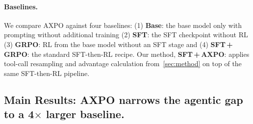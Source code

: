 \documentclass{llmxive}
\providecommand{\toolresample}{tool-call resampling\xspace}
\begin{document}
\paragraph{Baselines.}
We compare AXPO against four baselines: (1) \textbf{Base}: the base model only with prompting without additional training (2) \textbf{SFT}: the SFT checkpoint without RL (3) \textbf{GRPO}: RL from the base model without an SFT stage and (4) \textbf{SFT\,+\,GRPO}: the standard SFT-then-RL recipe.
Our method, \textbf{SFT\,+\,AXPO}: applies \toolresample and advantage calculation from~\autoref{sec:method} on top of the same SFT-then-RL pipeline.

\subsection{Main Results: AXPO narrows the agentic gap to a 4\texorpdfstring{$\times$}{...} larger baseline.}
\label{sec:main-results}
\end{document}
